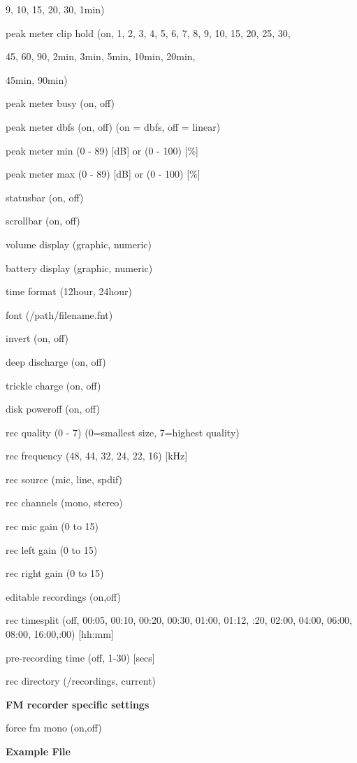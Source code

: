       9, 10, 15, 20, 30, 1min)

peak meter clip hold (on, 1, 2, 3, 4, 5, 6, 7, 8, 9, 10, 15, 20, 25, 30,


     45, 60, 90, 2min, 3min, 5min, 10min, 20min,

     45min, 90min)

peak meter busy  (on, off)

peak meter dbfs  (on, off) (on = dbfs, off = linear)

peak meter min  (0 {}- 89) [dB] or (0 {}- 100) [\%]

peak meter max  (0 {}- 89) [dB] or (0 {}- 100) [\%]

statusbar   (on, off)

scrollbar   (on, off)

volume display  (graphic, numeric)

battery display  (graphic, numeric)

time format   (12hour, 24hour)

font    (/path/filename.fnt)

invert    (on, off)

deep discharge  (on, off)

trickle charge  (on, off)

disk poweroff  (on, off)

rec quality   (0 {}- 7) (0=smallest size, 7=highest quality)

rec frequency  (48, 44, 32, 24, 22, 16) [kHz]

rec source    (mic, line, spdif)

rec channels  (mono, stereo)

rec mic gain  (0 to 15)

rec left gain  (0 to 15)

rec right gain  (0 to 15)

editable recordings (on,off)

rec timesplit  (off, 00:05, 00:10, 00:20, 00:30, 01:00, 01:12, :20, 02:00, 04:00, 06:00, 08:00, 16:00,:00) [hh:mm]

pre{}-recording time (off, 1{}-30) [secs]

rec directory  (/recordings, current) 

{\bfseries
FM recorder specific settings}

\textmd{force fm mono  (on,off)}

\textbf{Example File}

